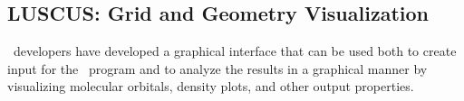 
%
%
%
%

\subsection{LUSCUS: Grid and Geometry Visualization}
\label{TUT:luscus}

\molcas\ developers have developed a graphical interface that can be used both
to create input for the \molcas\ program and to analyze the results in
a graphical manner by visualizing  molecular orbitals, density plots, and other output properties.

